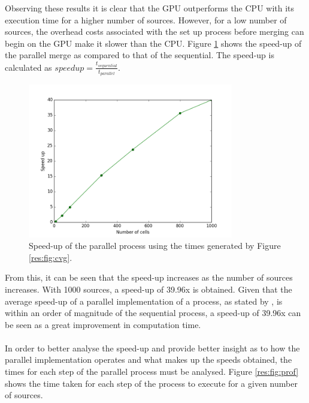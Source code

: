 Observing these results it is clear that the GPU outperforms the CPU with its execution time for a higher number of sources. However, for a low number of sources, the overhead costs associated with the set up process before merging can begin on the GPU make it slower than the CPU. Figure \ref{res:fig:speed} shows the speed-up of the parallel merge as compared to that of the sequential. The speed-up is calculated as $speedup = \frac{t_{sequential}}{t_{parallel}}$.
\begin{figure}[H]
\centering
\includegraphics[width=0.8\textwidth]{Images/result_speed.png}
\caption{Speed-up of the parallel process using the times generated by Figure \ref{res:fig:cvg}.}
\label{res:fig:speed}
\end{figure}
From this, it can be seen that the speed-up increases as the number of sources increases. With 1000 sources, a speed-up of 39.96x is obtained. Given that the average speed-up of a parallel implementation of a process, as stated by \citep{lee2010debunking}, is within an order of magnitude of the sequential process, a speed-up of 39.96x can be seen as a great improvement in computation time. 
\\
\\
In order to better analyse the speed-up and provide better insight as to how the parallel implementation operates and what makes up the speeds obtained, the times for each step of the parallel process must be analysed. Figure \ref{res:fig:prof} shows the time taken for each step of the process to execute for a given number of sources.
